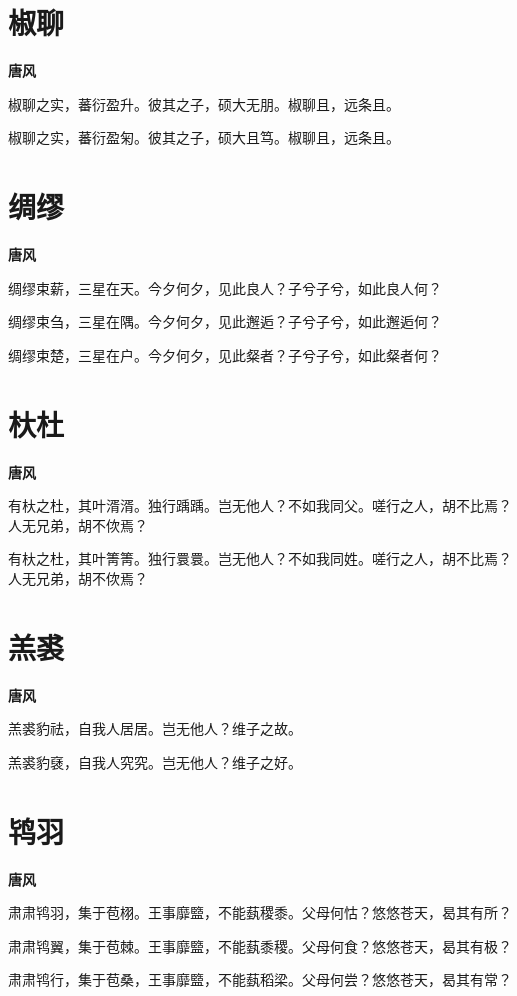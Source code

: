 \documentclass[12pt,a4paper]{ctexbook}
\begin{document}
\section{椒聊}
\textbf{唐风}\par\vspace{0.5em}
椒聊之实，蕃衍盈升。彼其之子，硕大无朋。椒聊且，远条且。\par
椒聊之实，蕃衍盈匊。彼其之子，硕大且笃。椒聊且，远条且。\par

\section{绸缪}
\textbf{唐风}\par\vspace{0.5em}
绸缪束薪，三星在天。今夕何夕，见此良人？子兮子兮，如此良人何？\par
绸缪束刍，三星在隅。今夕何夕，见此邂逅？子兮子兮，如此邂逅何？\par
绸缪束楚，三星在户。今夕何夕，见此粲者？子兮子兮，如此粲者何？\par

\section{杕杜}
\textbf{唐风}\par\vspace{0.5em}
有杕之杜，其叶湑湑。独行踽踽。岂无他人？不如我同父。嗟行之人，胡不比焉？人无兄弟，胡不佽焉？\par
有杕之杜，其叶箐箐。独行睘睘。岂无他人？不如我同姓。嗟行之人，胡不比焉？人无兄弟，胡不佽焉？\par

\section{羔裘}
\textbf{唐风}\par\vspace{0.5em}
羔裘豹祛，自我人居居。岂无他人？维子之故。\par
羔裘豹褎，自我人究究。岂无他人？维子之好。\par

\section{鸨羽}
\textbf{唐风}\par\vspace{0.5em}
肃肃鸨羽，集于苞栩。王事靡盬，不能蓺稷黍。父母何怙？悠悠苍天，曷其有所？\par
肃肃鸨翼，集于苞棘。王事靡盬，不能蓺黍稷。父母何食？悠悠苍天，曷其有极？\par
肃肃鸨行，集于苞桑，王事靡盬，不能蓺稻梁。父母何尝？悠悠苍天，曷其有常？\par
\end{document}
